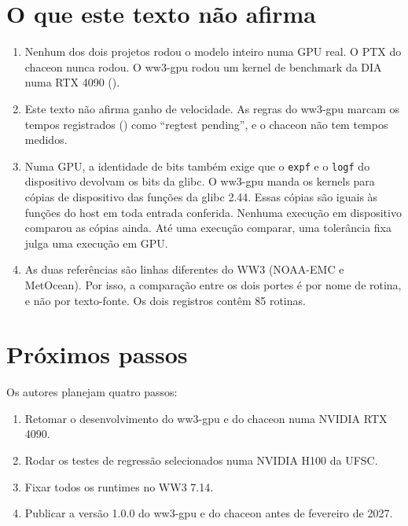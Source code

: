 \documentclass[10pt,a4paper,]{article}
\providecommand{\tightlist}{\setlength{\itemsep}{0pt}\setlength{\parskip}{0pt}}
\begin{document}
\section{O que este texto não afirma}\label{sec:limits}

\begin{enumerate}
\def\labelenumi{\arabic{enumi}.}
\tightlist
\item
  Nenhum dos dois projetos rodou o modelo inteiro numa GPU real. O PTX
  do chaceon nunca rodou. O ww3-gpu rodou um kernel de benchmark da DIA
  numa RTX 4090 ().
\item
  Este texto não afirma ganho de velocidade. As regras do ww3-gpu marcam
  os tempos registrados () como
  ``regtest pending'', e o chaceon não tem tempos medidos.
\item
  Numa GPU, a identidade de bits também exige que o \texttt{expf} e o
  \texttt{logf} do dispositivo devolvam os bits da glibc. O ww3-gpu
  manda os kernels para cópias de dispositivo das funções da glibc 2.44.
  Essas cópias são iguais às funções do host em toda entrada conferida.
  Nenhuma execução em dispositivo comparou as cópias ainda. Até uma
  execução comparar, uma tolerância fixa julga uma execução em GPU.
\item
  As duas referências são linhas diferentes do WW3 (NOAA-EMC e
  MetOcean). Por isso, a comparação entre os dois portes é por nome de
  rotina, e não por texto-fonte. Os dois registros contêm 85 rotinas.
\end{enumerate}

\section{Próximos passos}\label{sec:next}

Os autores planejam quatro passos:

\begin{enumerate}
\def\labelenumi{\arabic{enumi}.}
\tightlist
\item
  Retomar o desenvolvimento do ww3-gpu e do chaceon numa NVIDIA RTX
  4090.
\item
  Rodar os testes de regressão selecionados numa NVIDIA H100 da UFSC.
\item
  Fixar todos os runtimes no WW3 7.14.
\item
  Publicar a versão 1.0.0 do ww3-gpu e do chaceon antes de fevereiro de
  2027.
\end{enumerate}
\end{document}
